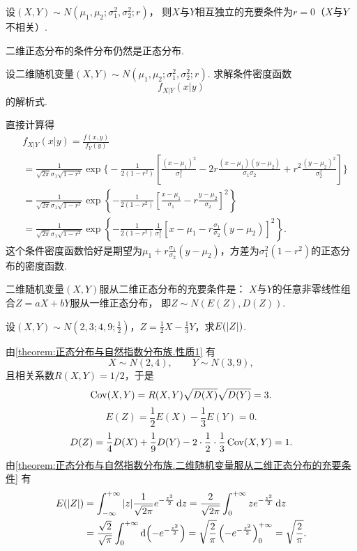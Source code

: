 \begin{corollary}\label{theorem:正态分布与自然指数分布族.性质3}
设\((X,Y) \sim N(\mu_1,\mu_2;\sigma_1^2,\sigma_2^2;r)\)，
则\(X\)与\(Y\)相互独立的充要条件为\(r=0\)（\(X\)与\(Y\)不相关）.
\end{corollary}

二维正态分布的条件分布仍然是正态分布.
\begin{example}\label{theorem:正态分布与自然指数分布族.性质4}
设二维随机变量\((X,Y) \sim N(\mu_1,\mu_2;\sigma_1^2,\sigma_2^2;r)\).
求解条件密度函数\[
f_{X \vert Y}(x \vert y)
\]的解析式.
\begin{solution}
\def\A{\frac{1}{\sqrt{2\pi}\sigma_1\sqrt{1-r^2}}}%
\def\B{\frac{1}{2(1-r^2)}}%
直接计算得\begin{align*}
&f_{X \vert Y}(x \vert y) = \frac{f(x,y)}{f_Y(y)} \\
&= \A
	\exp\Biggl\{
		- \B
		\left[
			\frac{(x-\mu_1)^2}{\sigma_1^2}
			- 2r\frac{(x-\mu_1)(y-\mu_2)}{\sigma_1\sigma_2}
			+ r^2\frac{(y-\mu_2)^2}{\sigma_2^2}
		\right]
	\Biggr\} \\
&= \A
	\exp\left\{
		- \B
		\left[
			\frac{x-\mu_1}{\sigma_1}
			- r\frac{y-\mu_2}{\sigma_2}
		\right]^2
	\right\} \\
&= \A
	\exp\left\{
		- \B
		\frac{1}{\sigma_1^2}
		\left[
			x - \mu_1
			- r\frac{\sigma_1}{\sigma_2}(y-\mu_2)
		\right]^2
	\right\}.
\end{align*}
这个条件密度函数恰好是期望为\(\mu_1+r\frac{\sigma_1}{\sigma_2}(y-\mu_2)\)，方差为\(\sigma_1^2(1-r^2)\)的正态分布的密度函数.
\end{solution}
\end{example}

\begin{theorem}\label{theorem:正态分布与自然指数分布族.二维随机变量服从二维正态分布的充要条件}
二维随机变量\((X,Y)\)服从二维正态分布的充要条件是：
\(X\)与\(Y\)的任意非零线性组合\(Z=aX+bY\)服从一维正态分布，
即\(Z \sim N(E(Z),D(Z))\).
\end{theorem}

\begin{example}
设\((X,Y) \sim N\left(2,3;4,9;\frac{1}{2}\right)\)，\(Z = \frac{1}{2} X - \frac{1}{3} Y\)，求\(E(\abs{Z})\).
\begin{solution}
由\cref{theorem:正态分布与自然指数分布族.性质1} 有\[
X \sim N(2,4), \qquad
Y \sim N(3,9),
\]且相关系数\(R(X,Y) = 1/2\)，于是\[
\operatorname{Cov}(X,Y) = R(X,Y) \sqrt{D(X)} \sqrt{D(Y)} = 3.
\]\[
E(Z) = \frac{1}{2} E(X) - \frac{1}{3} E(Y) = 0.
\]\[
D(Z) = \frac{1}{4} D(X) + \frac{1}{9} D(Y)
	- 2 \cdot \frac{1}{2} \cdot \frac{1}{3} \operatorname{Cov}(X,Y)
= 1.
\]
由\cref{theorem:正态分布与自然指数分布族.二维随机变量服从二维正态分布的充要条件} 有\begin{align*}
E(\abs{Z})
&= \int_{-\infty}^{+\infty} \abs{z} \frac{1}{\sqrt{2\pi}} e^{-\frac{z^2}{2}} \dd{z}
= \frac{2}{\sqrt{2\pi}} \int_0^{+\infty} z e^{-\frac{z^2}{2}} \dd{z} \\
&= \frac{\sqrt{2}}{\sqrt{\pi}} \int_0^{+\infty} \dd(-e^{-\frac{z^2}{2}})
= \sqrt{\frac{2}{\pi}} \left(-e^{-\frac{z^2}{2}}\right)_0^{+\infty}
= \sqrt{\frac{2}{\pi}}.
\end{align*}
\end{solution}
\end{example}

